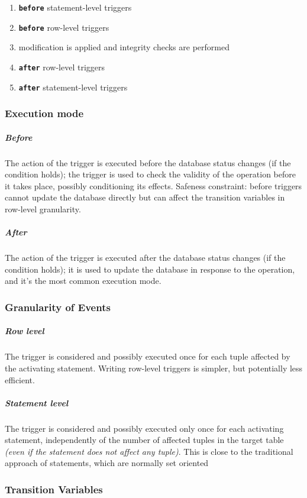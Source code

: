 \documentclass[english]{article}
\begin{document}
\begin{enumerate}
  \item \textbf{\texttt{before}} statement-level triggers
  \item \textbf{\texttt{before}} row-level triggers
  \item modification is applied and integrity checks are performed
  \item \textbf{\texttt{after}} row-level triggers
  \item \textbf{\texttt{after}} statement-level triggers
\end{enumerate}

\subsubsection{Execution mode}

\subparagraph*{Before}
The action of the trigger is executed before the database status changes (if the condition holds);
the trigger is used to check the validity of the operation before it takes place, possibly conditioning its effects.
Safeness constraint: before triggers cannot update the database directly but can affect the transition variables in row-level granularity.

\subparagraph*{After}

The action of the trigger is executed after the database status changes (if the condition holds);
it is used to update the database in response to the operation, and it's the most common execution mode.

\subsubsection{Granularity of Events}

\subparagraph*{Row level}
The trigger is considered and possibly executed once for each tuple affected by the activating statement.
Writing row-level triggers is simpler, but potentially less efficient.

\subparagraph*{Statement level}
The trigger is considered and possibly executed only once for each activating statement, independently of the number of affected tuples in the target table \textit{(even if the statement does not affect any tuple)}.
This is close to the traditional approach of \sql statements, which are normally set oriented

\subsubsection{Transition Variables}
\end{document}
